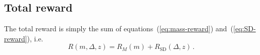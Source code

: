 \documentclass[12pt,twoside]{article}
\begin{document}
\subsection{Total reward}

The total reward is simply the sum of equations~(\ref{eq:mass-reward})
and~(\ref{eq:SD-reward}), i.e.
\begin{equation}
  \label{eq:reward}
  R(m,\Delta,z) = R_M(m) + R_\text{SD}(\Delta, z)\,.
\end{equation}

\end{document}
